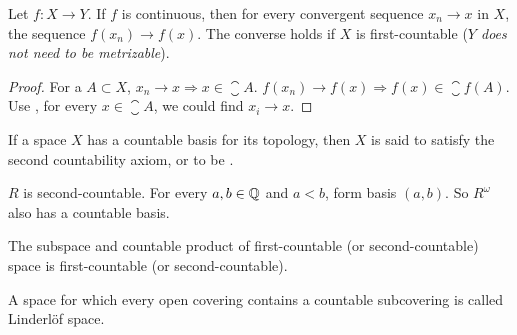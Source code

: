 \begin{theorem}
    Let $f: X \rightarrow Y$. If $f$ is continuous, then for every convergent sequence $x_n \rightarrow x$ in $X$, the sequence $f(x_n) \rightarrow f(x)$. The converse holds if $X$ is first-countable (\emph{$Y$ does not need to be metrizable}).
\end{theorem}
\begin{proof}
    For a $A \subset X$,  $x_n \rightarrow x \Rightarrow x \in \closure{A}$. $f(x_n) \rightarrow f(x) \Rightarrow f(x) \in \closure{f(A)}$. Use , for every $x \in \closure{A}$, we could find $x_i \rightarrow x$.
\end{proof}

\begin{definition}
    If a space $X$ has a countable basis for its topology, then $X$ is said to satisfy the second countability axiom, or to be .
\end{definition}

\begin{example}
    $R$ is second-countable. For every $a,b \in \mathbb{Q}$ and $a < b$, form basis $(a,b)$. So $R^\omega$ also has a countable basis.
\end{example}

\begin{theorem}
    The subspace and countable product of first-countable (or second-countable) space is first-countable (or second-countable).
\end{theorem}


\begin{definition}
    A space for which every open covering contains a countable subcovering is called Linderl\"of space.
\end{definition}


